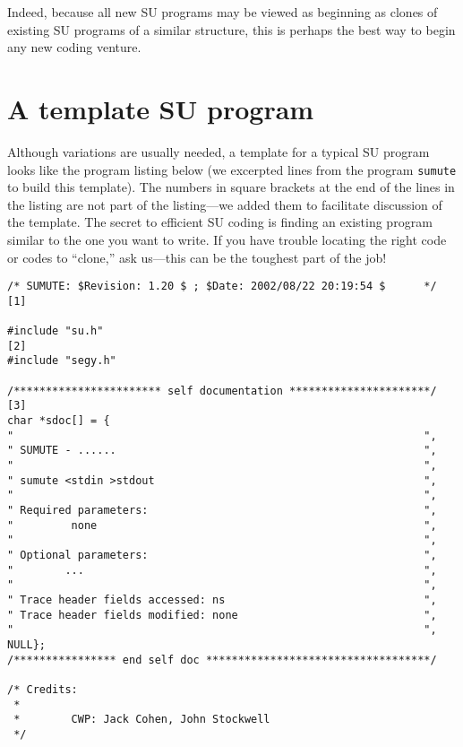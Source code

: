 {{{{{{{Indeed, because all new SU programs may be viewed as beginning as clones of existing SU
programs of a similar structure, this is perhaps the best way to begin any new coding
venture.


\section {A template SU program\label{SU:sec:template}}
Although variations are usually needed, a template for a typical {\small\sf SU} program
looks like the program listing below (we excerpted lines from the program {\tt sumute} to 
build this template).  The numbers in square brackets at the end of the lines in the 
listing are not part of the listing---we added them to facilitate discussion of the 
template.  The secret to efficient {\small\sf SU} coding is finding an existing program 
similar to the one you want to write.  If you have trouble locating the right code or 
codes to ``clone,'' ask us---this can be the toughest part of the job!
 
{\small\begin{verbatim}
/* SUMUTE: $Revision: 1.20 $ ; $Date: 2002/08/22 20:19:54 $      */  [1]

#include "su.h"                                                     [2]
#include "segy.h"

/*********************** self documentation **********************/ [3]
char *sdoc[] = {
"                                                                ",
" SUMUTE - ......                                                ",
"                                                                ",
" sumute <stdin >stdout                                          ",
"                                                                ",
" Required parameters:                                           ",
"         none                                                   ",
"                                                                ",
" Optional parameters:                                           ",
"        ...                                                     ",
"                                                                ",
" Trace header fields accessed: ns                               ",
" Trace header fields modified: none                             ",
"                                                                ",
NULL};
/**************** end self doc ***********************************/

/* Credits:
 *
 *        CWP: Jack Cohen, John Stockwell
 */



\end{verbatim}}}}}}}}}
